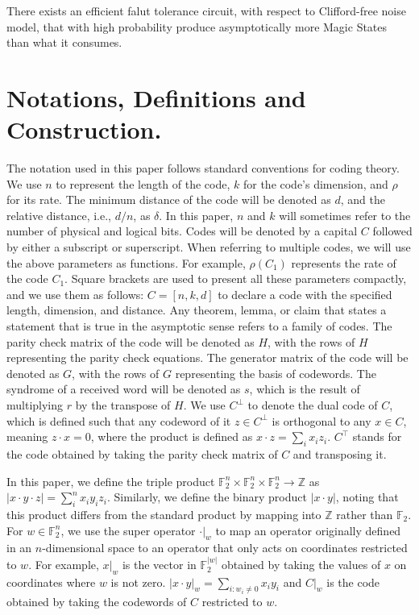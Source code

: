 \begin{theorem}
  There exists an efficient falut tolerance circuit, with respect to Clifford-free noise model, that with high probability produce asymptotically more Magic States than what it consumes.
\end{theorem}
\section{Notations, Definitions and Construction.} The notation used in this paper follows standard conventions for coding theory. We use $n$ to represent the length of the code, $k$ for the code's dimension, and $\rho$ for its rate. The minimum distance of the code will be denoted as $d$, and the relative distance, i.e., $d/n$, as $\delta$. In this paper, $n$ and $k$ will sometimes refer to the number of physical and logical bits. Codes will be denoted by a capital $C$ followed by either a subscript or superscript. When referring to multiple codes, we will use the above parameters as functions. For example, $\rho(C_{1})$ represents the rate of the code $C_{1}$. Square brackets are used to present all these parameters compactly, and we use them as follows: $C=[n,k,d]$ to declare a code with the specified length, dimension, and distance. Any theorem, lemma, or claim that states a statement that is true in the asymptotic sense refers to a family of codes. The parity check matrix of the code will be denoted as $H$, with the rows of $H$ representing the parity check equations. The generator matrix of the code will be denoted as $G$, with the rows of $G$ representing the basis of codewords. The syndrome of a received word will be denoted as $s$, which is the result of multiplying $r$ by the transpose of $H$. We use $C^\perp$ to denote the dual code of $C$, which is defined such that any codeword of it $z\in C^\perp$ is orthogonal to any $x\in C$, meaning $z\cdot x = 0$, where the product is defined as $x\cdot z = \sum_{i}{x_{i}z_{i}}$. $C^{\top}$ stands for the code obtained by taking the parity check matrix of $C$ and transposing it.

In this paper, we define the triple product $\mathbb{F}_2^{n}\times \mathbb{F}_2^{n}\times\mathbb{F}_2^{n} \rightarrow \mathbb{Z}$ as $|x\cdot y \cdot z| = \sum_{i}^{n}{x_{i}y_{i}z_{i}}$. Similarly, we define the binary product $|x \cdot y|$, noting that this product differs from the standard product by mapping into $\mathbb{Z}$ rather than $\mathbb{F}_{2}$. For $w \in \mathbb{F}_{2}^{n}$, we use the super operator $ \cdot |_{w} $ to map an operator originally defined in an $n$-dimensional space to an operator that only acts on coordinates restricted to $w$. For example, $x|_{w}$ is the vector in $\mathbb{F}_{2}^{|w|}$ obtained by taking the values of $x$ on coordinates where $w$ is not zero. $|x\cdot y|_{w} = \sum_{i:w_{i}\neq 0}{x_{i}y_{i}}$ and $C|_{w}$ is the code obtained by taking the codewords of $C$ restricted to $w$.

